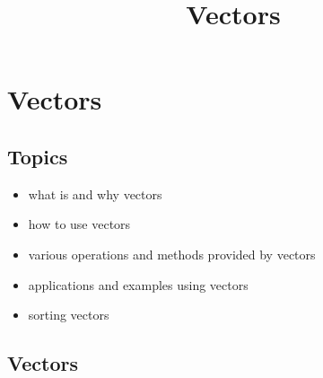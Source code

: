 \documentclass[11pt]{article}
\title{Vectors}
\providecommand{\tightlist}{%
      \setlength{\itemsep}{0pt}\setlength{\parskip}{0pt}}
\begin{document}
    
    \maketitle
    
    

    
    \hypertarget{vectors}{%
\section{Vectors}\label{vectors}}

\hypertarget{topics}{%
\subsection{Topics}\label{topics}}

\begin{itemize}
\tightlist
\item
  what is and why vectors
\item
  how to use vectors
\item
  various operations and methods provided by vectors
\item
  applications and examples using vectors
\item
  sorting vectors
\end{itemize}

    \hypertarget{vectors}{%
\subsection{Vectors}\label{vectors}}
\end{document}
